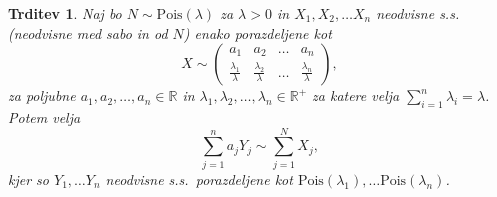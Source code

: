 \documentclass[12pt, a4paper, reqno]{amsart}
\theoremstyle{definition} %
\theoremstyle{plain} %
\newtheorem{trditev}[definicija]{Trditev}
\newcommand{\R}{\mathbb{R}}
\newcommand{\1}{\mathds{1}}
\newcommand{\Pois}[1]{\text{Pois}(#1)}
\begin{document}
    
    \begin{trditev}
        Naj bo $N\sim \Pois{\lambda}$  za $\lambda >0$ in $X_1, X_2, \dots X_n$ neodvisne s.s. (neodvisne 
        med sabo in od $N$) enako porazdeljene kot
        $$ X\sim
        \begin{pmatrix}
            a_1 & a_2 &  \dots & a_n \\
            \tfrac{\lambda_1}{\lambda} & \tfrac{\lambda_2}{\lambda} & \dots & \tfrac{\lambda_n}{\lambda}
        \end{pmatrix},
        $$
        za poljubne $a_1, a_2, \dots, a_n \in \R$ in 
        $\lambda_1, \lambda_2, \dots, \lambda_n \in \R^+$ za katere velja 
        ${\sum_{i=1}^n\lambda_i = \lambda}$.
        Potem velja 
        \begin{equation*}
            \sum_{j=1}^na_jY_j \sim \sum_{j=1}^NX_j,
        \end{equation*}
        kjer so $Y_1, \dots Y_n$ neodvisne s.s.\ porazdeljene kot 
        $\Pois{\lambda_1}, \dots \Pois{\lambda_n}$.
        \label{trd:NXjeEnakoaY}
    \end{trditev}
\end{document}
